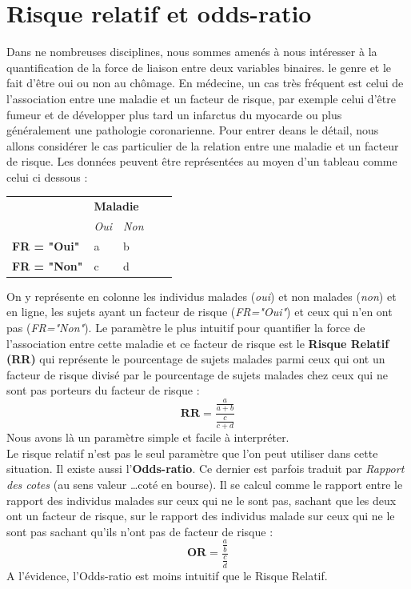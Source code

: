 \newpage 
\section{Risque relatif et odds-ratio}
Dans ne nombreuses disciplines, nous sommes amenés à nous intéresser à la  quantification de la force de liaison entre deux variables binaires. le genre et le fait d'être oui ou non au chômage. En médecine, un cas très fréquent est celui de l'association entre une maladie et un facteur de risque, par exemple celui d'être fumeur et de développer plus tard un infarctus du myocarde ou plus généralement une pathologie coronarienne.\newline
Pour entrer deans le détail, nous allons considérer le cas particulier de la relation entre une maladie et un facteur de risque. Les données peuvent être représentées au moyen d'un tableau comme celui ci dessous : 

\begin{center}
\begin{tabular}{l|l|l|ll}
\cline{2-3}
 & \multicolumn{2}{l|}{\textbf{Maladie}} &  &  \\ \cline{2-3}
 & \textit{Oui} & \textit{Non} &  &  \\ \cline{1-3}
\multicolumn{1}{|l|}{\textbf{FR = "Oui"}} & a & b &  &  \\ \cline{1-3}
\multicolumn{1}{|l|}{\textbf{FR = "Non"}} & c & d &  &  \\  \cline{1-3}
\end{tabular}
\end{center}
On y représente en colonne les individus malades (\textit{oui}) et non malades (\textit{non}) et en ligne, les sujets ayant un facteur de risque (\textit{FR="Oui"}) et ceux qui n'en ont pas (\textit{FR="Non"}).\newline
Le paramètre le plus intuitif pour quantifier la force de l'association entre cette maladie et ce facteur de risque  est le \textbf{Risque Relatif (RR)} qui représente le pourcentage de sujets malades parmi ceux qui ont un facteur de risque divisé par le pourcentage de sujets malades chez ceux qui ne sont pas porteurs du facteur de risque : 
$$\mathbf{\textrm{RR}} = \frac{\frac{a}{a+b}}{\frac{c}{c+d}}$$
Nous avons là un paramètre simple et facile à interpréter.\newline
\\
Le risque relatif n'est pas le seul paramètre que l'on peut utiliser dans cette situation. Il existe aussi l'\textbf{Odds-ratio}. Ce dernier est parfois traduit par \textit{Rapport des cotes} (au sens valeur \dots coté en bourse).\newline
Il se calcul comme le rapport entre le rapport des individus malades sur ceux qui ne le sont pas, sachant que les deux ont un facteur de risque, sur le rapport des individus malade sur ceux qui ne le sont pas sachant qu'ils n'ont pas de facteur de risque : 
$$\mathbf{\textrm{OR}} = \frac{\frac{a}{b}}{\frac{c}{d}}$$
A l'évidence, l'Odds-ratio est moins intuitif que le Risque Relatif.
